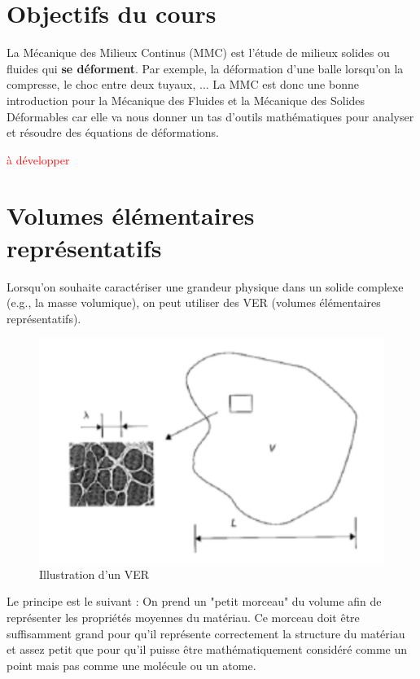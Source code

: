 \section{Objectifs du cours}
La Mécanique des Milieux Continus (MMC) est l'étude de milieux solides ou fluides qui \textbf{se déforment}. Par exemple, la déformation d'une balle lorsqu'on la compresse, le choc entre deux tuyaux, ... La MMC est donc une bonne introduction pour la Mécanique des Fluides et la Mécanique des Solides Déformables car elle va nous donner un tas d'outils mathématiques pour analyser et résoudre des équations de déformations.


\textcolor{red}{à développer}

\section{Volumes élémentaires représentatifs}
Lorsqu'on souhaite caractériser une grandeur physique dans un solide complexe (e.g., la masse volumique), on peut utiliser des VER (volumes élémentaires représentatifs). 
\begin{figure}[H]
    \centering
    \includegraphics[scale = 0.75]{Images/Images_Introduciton/VER_Schema.png}
    \caption{Illustration d'un VER \protect\footnotemark}
    \label{fig:my_label}
\end{figure}
Le principe est le suivant : On prend un "petit morceau" du volume afin de représenter les propriétés moyennes du matériau. Ce morceau doit être suffisamment grand pour qu'il  représente correctement la structure du matériau et assez petit que pour qu'il puisse être mathématiquement considéré comme un point mais pas comme une molécule ou un atome.

